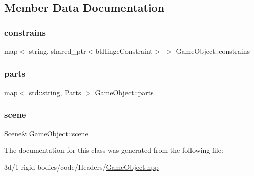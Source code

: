 \subsection{Member Data Documentation}
\mbox{\label{class_game_object_ab6ea7ad55d467cc31cd6addf2465f40c}} 
\subsubsection{\texorpdfstring{constrains}{constrains}}
{\footnotesize\ttfamily map$<$ string, shared\+\_\+ptr$<$bt\+Hinge\+Constraint$>$ $>$ Game\+Object\+::constrains\hspace{0.3cm}{\ttfamily [protected]}}

\mbox{\label{class_game_object_a793b910e9851728a522aba85fe7b829e}} 
\subsubsection{\texorpdfstring{parts}{parts}}
{\footnotesize\ttfamily map$<$ std\+::string, \mbox{\hyperlink{struct_game_object_1_1_parts}{Parts}} $>$ Game\+Object\+::parts\hspace{0.3cm}{\ttfamily [protected]}}

\mbox{\label{class_game_object_aeea61de934e13603696b4ed00e9fe42e}} 
\subsubsection{\texorpdfstring{scene}{scene}}
{\footnotesize\ttfamily \mbox{\hyperlink{class_scene}{Scene}}\& Game\+Object\+::scene\hspace{0.3cm}{\ttfamily [protected]}}



The documentation for this class was generated from the following file\+:\begin{DoxyCompactItemize}
\item 
3d/1 rigid bodies/code/\+Headers/\mbox{\hyperlink{_game_object_8hpp}{Game\+Object.\+hpp}}\end{DoxyCompactItemize}
